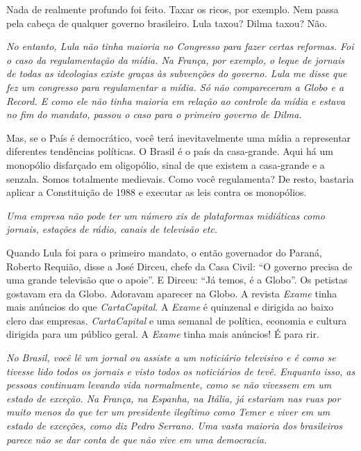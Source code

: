 \normalfont 
Nada de realmente profundo foi feito. Taxar os ricos, por
exemplo. Nem passa pela cabeça de qualquer governo brasileiro. Lula
taxou? Dilma taxou? Não.

\itshape
No entanto, Lula não tinha maioria no Congresso para
fazer certas reformas. Foi o caso da regulamentação da mídia. Na França,
por exemplo, o leque de jornais de todas as ideologias existe graças às
subvenções do governo. Lula me disse que fez um congresso para
regulamentar a mídia. Só não compareceram a Globo e a Record. E como ele
não tinha maioria em relação ao controle da mídia e estava no fim do
mandato, passou o caso para o primeiro governo de Dilma.

\normalfont 
Mas, se o País é democrático, você terá inevitavelmente
uma mídia a representar diferentes tendências políticas. O Brasil é o
país da casa-grande. Aqui há um monopólio disfarçado em oligopólio,
sinal de que existem a casa-grande e a senzala. Somos totalmente
medievais. Como você regulamenta? De resto, bastaria aplicar a
Constituição de 1988 e executar as leis contra os monopólios.

\itshape
Uma empresa não pode ter um número xis de plataformas
midiáticas como jornais, estações de rádio, canais de televisão etc.

\normalfont 
Quando Lula foi para o primeiro mandato, o então
governador do Paraná, Roberto Requião, disse a José Dirceu, chefe da
Casa Civil: ``O governo precisa de uma grande televisão que o apoie''. E
Dirceu: ``Já temos, é a Globo''. Os petistas gostavam era da Globo.
Adoravam aparecer na Globo. A revista \emph{Exame} tinha mais anúncios
do que \emph{CartaCapital}. A \emph{Exame} é quinzenal e dirigida ao
baixo clero das empresas. \emph{CartaCapital} e uma semanal de política,
economia e cultura dirigida para um público geral. A \emph{Exame} tinha
mais anúncios! É para rir.

\itshape
No Brasil, você lê um jornal ou assiste a um noticiário
televisivo e é como se tivesse lido todos os jornais e visto todos os
noticiários de tevê. Enquanto isso, as pessoas continuam levando vida
normalmente, como se não vivessem em um estado de exceção. Na França, na
Espanha, na Itália, já estariam nas ruas por muito menos do que ter um
presidente ilegítimo como Temer e viver em um estado de exceções, como
diz Pedro Serrano. Uma vasta maioria dos brasileiros parece não se dar
conta de que não vive em uma democracia.

